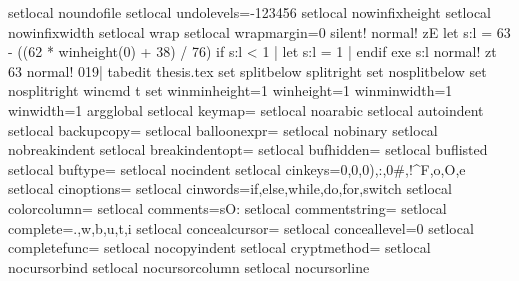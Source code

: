 {{setlocal noundofile
setlocal undolevels=-123456
setlocal nowinfixheight
setlocal nowinfixwidth
setlocal wrap
setlocal wrapmargin=0
silent! normal! zE
let s:l = 63 - ((62 * winheight(0) + 38) / 76)
if s:l < 1 | let s:l = 1 | endif
exe s:l
normal! zt
63
normal! 019|
tabedit thesis.tex
set splitbelow splitright
set nosplitbelow
set nosplitright
wincmd t
set winminheight=1 winheight=1 winminwidth=1 winwidth=1
argglobal
setlocal keymap=
setlocal noarabic
setlocal autoindent
setlocal backupcopy=
setlocal balloonexpr=
setlocal nobinary
setlocal nobreakindent
setlocal breakindentopt=
setlocal bufhidden=
setlocal buflisted
setlocal buftype=
setlocal nocindent
setlocal cinkeys=0{,0},0),:,0#,!^F,o,O,e
setlocal cinoptions=
setlocal cinwords=if,else,while,do,for,switch
setlocal colorcolumn=
setlocal comments=sO:%
setlocal commentstring=%
setlocal complete=.,w,b,u,t,i
setlocal concealcursor=
setlocal conceallevel=0
setlocal completefunc=
setlocal nocopyindent
setlocal cryptmethod=
setlocal nocursorbind
setlocal nocursorcolumn
setlocal nocursorline
}}
